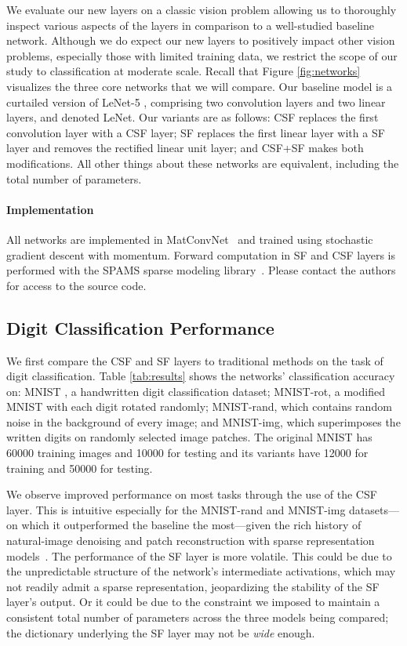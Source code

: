 \documentclass[10pt,twocolumn,letterpaper]{article}
\begin{document}
We evaluate our new layers on a classic vision problem allowing us to thoroughly inspect various aspects of the layers in comparison to a well-studied baseline network.  Although we do expect our new layers to positively impact other vision problems, especially those with limited training data, we restrict the scope of our study to classification at moderate scale.  Recall that Figure \ref{fig:networks} visualizes the three core networks that we will compare.
Our baseline model is a curtailed version of LeNet-5 \cite{LeBoBeIEEE1998}, comprising two convolution layers and two linear layers, and denoted LeNet. Our variants are as follows: CSF replaces the first convolution layer with a CSF layer; SF replaces the first linear layer with a SF layer and removes the rectified linear unit layer; and CSF+SF makes both modifications.  All other things about these networks are equivalent, including the total number of parameters.  

\paragraph{Implementation} All networks are implemented in MatConvNet~ \cite{VeLeACMMulti2015} and trained using stochastic gradient descent with momentum. Forward computation in SF and CSF layers is performed with the SPAMS sparse modeling library~\cite{MaBaPoJMLR2010}.  Please contact the authors for access to the source code.


\subsection{Digit Classification Performance}
We first compare the CSF and SF layers to traditional methods on the task of digit classification. Table \ref{tab:results} shows the networks' classification accuracy on: MNIST \cite{LeBoBeIEEE1998}, a handwritten digit classification dataset; MNIST-rot, a modified MNIST with each digit rotated randomly; MNIST-rand, which contains random noise in the background of every image; and MNIST-img, which superimposes the written digits on randomly selected image patches. The original MNIST has 60000 training images and 10000 for testing and its variants have 12000 for training and 50000 for testing.

We observe improved performance on most tasks through the use of the CSF layer. This is intuitive especially for the MNIST-rand and MNIST-img datasets---on which it outperformed the baseline the most---given the rich history of natural-image denoising and patch reconstruction with sparse representation models~\cite{ElBOOK2010}. The performance of the SF layer is more volatile. This could be due to the unpredictable structure of the network's intermediate activations, which may not readily admit a sparse representation, jeopardizing the stability of the SF layer's output.  Or it could be due to the constraint we imposed to maintain a consistent total number of parameters across the three models being compared; the dictionary underlying the SF layer may not be \textit{wide} enough.
\end{document}
